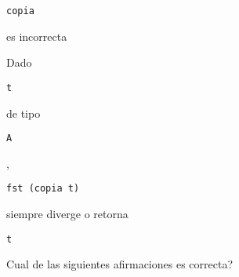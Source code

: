 \documentclass{gift}
\begin{document}
\begin{giftMO}
\verb!copia!
\begin{giftFragmento}
es incorrecta\end  {giftFragmento}


\item \begin{giftFragmento}
Dado\end  {giftFragmento}

\verb!t!
\begin{giftFragmento}
de tipo\end  {giftFragmento}

\verb!A!
\begin{giftFragmento}
,\end  {giftFragmento}

\verb!fst (copia t)!
\begin{giftFragmento}
siempre diverge o retorna\end  {giftFragmento}

\verb!t!
\begin{giftFragmento}
\end  {giftFragmento}


\end  {giftMO}

\begin{giftFragmento}
\end  {giftFragmento}


\begin{giftComentario}
 
 
\end  {giftComentario}

\begin{giftComentario}
 
\end  {giftComentario}
\begin{giftFragmento}
Cual de las siguientes afirmaciones es correcta?\end  {giftFragmento}
\end{document}
